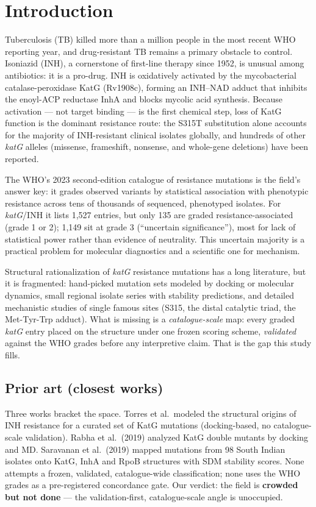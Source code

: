 \documentclass[11pt]{article}
\begin{document}
\section{Introduction}
Tuberculosis (TB) killed more than a million people in the most recent WHO reporting year, and drug-resistant TB remains a primary obstacle to control. Isoniazid (INH), a cornerstone of first-line therapy since 1952, is unusual among antibiotics: it is a pro-drug. INH is oxidatively activated by the mycobacterial catalase-peroxidase KatG (Rv1908c), forming an INH--NAD adduct that inhibits the enoyl-ACP reductase InhA and blocks mycolic acid synthesis. Because activation --- not target binding --- is the first chemical step, loss of KatG function is the dominant resistance route: the S315T substitution alone accounts for the majority of INH-resistant clinical isolates globally, and hundreds of other \textit{katG} alleles (missense, frameshift, nonsense, and whole-gene deletions) have been reported.

The WHO's 2023 second-edition catalogue of resistance mutations is the field's answer key: it grades observed variants by statistical association with phenotypic resistance across tens of thousands of sequenced, phenotyped isolates. For \textit{katG}/INH it lists 1,527 entries, but only 135 are graded resistance-associated (grade 1 or 2); 1,149 sit at grade 3 (``uncertain significance''), most for lack of statistical power rather than evidence of neutrality. This uncertain majority is a practical problem for molecular diagnostics and a scientific one for mechanism.

Structural rationalization of \textit{katG} resistance mutations has a long literature, but it is fragmented: hand-picked mutation sets modeled by docking or molecular dynamics, small regional isolate series with stability predictions, and detailed mechanistic studies of single famous sites (S315, the distal catalytic triad, the Met-Tyr-Trp adduct). What is missing is a \emph{catalogue-scale} map: every graded \textit{katG} entry placed on the structure under one frozen scoring scheme, \emph{validated} against the WHO grades before any interpretive claim. That is the gap this study fills.

\subsection{Prior art (closest works)}
Three works bracket the space. Torres et al.\ modeled the structural origins of INH resistance for a curated set of KatG mutations (docking-based, no catalogue-scale validation). Rabha et al.\ (2019) analyzed KatG double mutants by docking and MD. Saravanan et al.\ (2019) mapped mutations from 98 South Indian isolates onto KatG, InhA and RpoB structures with SDM stability scores. None attempts a frozen, validated, catalogue-wide classification; none uses the WHO grades as a pre-registered concordance gate. Our verdict: the field is \textbf{crowded but not done} --- the validation-first, catalogue-scale angle is unoccupied.
\end{document}
